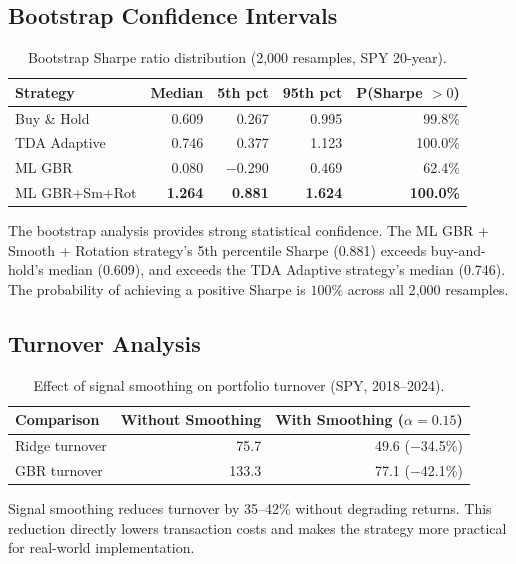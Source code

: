 \documentclass[11pt, a4paper]{article}
\begin{document}
\subsection{Bootstrap Confidence Intervals}

\begin{table}[H]
\centering
\caption{Bootstrap Sharpe ratio distribution (2{,}000 resamples, SPY 20-year).}
\label{tab:bootstrap}
\begin{tabular}{lrrrr}
\toprule
\textbf{Strategy} & \textbf{Median} & \textbf{5th pct} & \textbf{95th pct} & \textbf{P(Sharpe $> 0$)} \\
\midrule
Buy \& Hold       & 0.609 & 0.267 & 0.995 & 99.8\% \\
TDA Adaptive      & 0.746 & 0.377 & 1.123 & 100.0\% \\
ML GBR            & 0.080 & $-$0.290 & 0.469 & 62.4\% \\
ML GBR+Sm+Rot     & \textbf{1.264} & \textbf{0.881} & \textbf{1.624} & \textbf{100.0\%} \\
\bottomrule
\end{tabular}
\end{table}

The bootstrap analysis provides strong statistical confidence. The ML GBR + Smooth + Rotation strategy's 5th percentile Sharpe (0.881) exceeds buy-and-hold's median (0.609), and exceeds the TDA Adaptive strategy's median (0.746). The probability of achieving a positive Sharpe is $100\%$ across all 2{,}000 resamples.

\subsection{Turnover Analysis}

\begin{table}[H]
\centering
\caption{Effect of signal smoothing on portfolio turnover (SPY, 2018--2024).}
\label{tab:turnover}
\begin{tabular}{lrr}
\toprule
\textbf{Comparison} & \textbf{Without Smoothing} & \textbf{With Smoothing ($\alpha = 0.15$)} \\
\midrule
Ridge turnover  & 75.7 & 49.6 \quad ($-$34.5\%) \\
GBR turnover    & 133.3 & 77.1 \quad ($-$42.1\%) \\
\bottomrule
\end{tabular}
\end{table}

Signal smoothing reduces turnover by 35--42\% without degrading returns. This reduction directly lowers transaction costs and makes the strategy more practical for real-world implementation.
\end{document}
